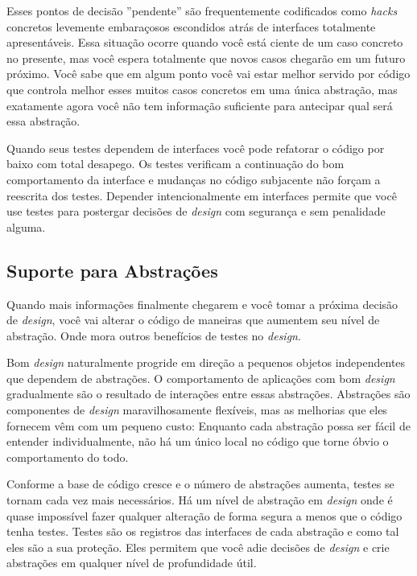 Esses pontos de decisão ''pendente'' são frequentemente codificados como \textit{hacks} concretos levemente embaraçosos escondidos atrás de interfaces totalmente apresentáveis. Essa situação ocorre quando você está ciente de um caso concreto no presente, mas você espera totalmente que novos casos chegarão em um futuro próximo. Você sabe que em algum ponto você vai estar melhor servido por código que controla melhor esses muitos casos concretos em uma única abstração, mas exatamente agora você não tem informação suficiente para antecipar qual será essa abstração.

Quando seus testes dependem de interfaces você pode refatorar o código por baixo com total desapego. Os testes verificam a continuação do bom comportamento da interface e mudanças no código subjacente não forçam a reescrita dos testes. Depender intencionalmente em interfaces permite que você use testes para postergar decisões de \textit{design} com segurança e sem penalidade alguma.  

\subsection{Suporte para Abstrações}

Quando mais informações finalmente chegarem e você tomar a próxima decisão de \textit{design}, você vai alterar o código de maneiras que aumentem seu nível de abstração. Onde mora outros benefícios de testes no \textit{design}.

Bom \textit{design} naturalmente progride em direção a pequenos objetos independentes que dependem de abstrações. O comportamento de aplicações com bom \textit{design} gradualmente são o resultado de interações entre essas abstrações. Abstrações são componentes de \textit{design} maravilhosamente flexíveis, mas as melhorias que eles fornecem vêm com um pequeno custo: Enquanto cada abstração possa ser fácil de entender individualmente, não há um único local no código que torne óbvio o comportamento do todo.

Conforme a base de código cresce e o número de abstrações aumenta, testes se tornam cada vez mais necessários. Há um nível de abstração em \textit{design} onde é quase impossível fazer qualquer alteração de forma segura a menos que o código tenha testes. Testes são os registros das interfaces de cada abstração e como tal eles são a sua proteção. Eles permitem que você adie decisões de \textit{design} e crie abstrações em qualquer nível de profundidade útil.

